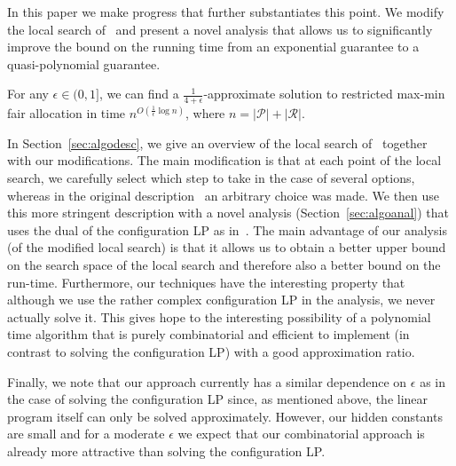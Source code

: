 \documentclass{llncs}
\newcommand{\res}{\ensuremath{\mathcal{R}}\xspace}
\newcommand{\players}{\ensuremath{\mathcal{P}}\xspace}
\begin{document}
In this paper we make progress that further substantiates this
point. We modify the local search of~\cite{AFS08} and present
a novel analysis that allows us to significantly improve the bound on the
running time from an exponential guarantee to a quasi-polynomial
guarantee.
\begin{theorem}
\label{thm:main}
  For any $\epsilon \in (0,1]$, we can find a
  $\frac{1}{4+\epsilon}$-approximate solution to  restricted
  max-min fair allocation in time $n^{O\left(\frac{1}{\epsilon}
    \log n\right)}$, where $n= |\players| + |\res|$.
\end{theorem}

In Section~\ref{sec:algodesc}, we give an overview of the local search
of~\cite{AFS08} together with our modifications. The main modification
is that at each point of the local search, we carefully select which step
to take in the case of several options, whereas in the original
description~\cite{AFS08} an arbitrary choice was made. We then use
this more stringent description with a novel analysis (Section~\ref{sec:algoanal})
that uses the dual of the configuration LP as in~\cite{SME11}. The
main advantage of our analysis (of the modified local search) is that
it allows us to obtain a better upper bound on the search space of the
local search and therefore also a better bound on the run-time.
Furthermore, our techniques have the interesting property that
although we use the rather complex configuration LP in the analysis,
we never actually solve it.  This gives hope to the interesting
possibility of a polynomial time algorithm that is purely
combinatorial and efficient to implement (in contrast to solving the
configuration LP) with a good approximation ratio.

Finally, we note that our approach currently has a similar dependence on
$\epsilon$ as in the case of solving the configuration LP since, as
mentioned above, the linear program itself can only be solved
approximately. However, our hidden constants are small and for a
moderate $\epsilon$ we  expect that our combinatorial approach is
already more attractive than solving the configuration LP.
\end{document}
